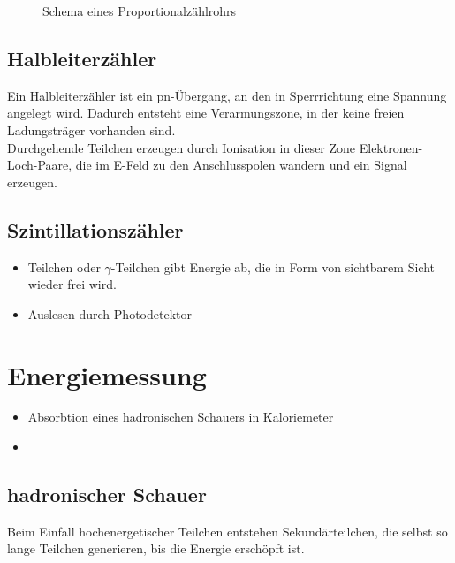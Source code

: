 \documentclass[Ex4_Zusammenfassung.tex]{subfiles}
\begin{document}
\begin{figure}[H]
	\centering
	\caption{Schema eines Proportionalzählrohrs}\label{Proportionalzaehlrohr}
	
\end{figure}

\subsection{Halbleiterzähler}
Ein Halbleiterzähler ist ein pn-Übergang, an den in Sperrrichtung eine Spannung angelegt wird. Dadurch entsteht eine Verarmungszone, in der keine freien Ladungsträger vorhanden sind.\\
Durchgehende Teilchen erzeugen durch Ionisation in dieser Zone Elektronen-Loch-Paare, die im E-Feld zu den Anschlusspolen wandern und ein Signal erzeugen. 

\subsection{Szintillationszähler}
\begin{itemize}
	\item Teilchen oder $\gamma$-Teilchen gibt Energie ab, die in Form von sichtbarem Sicht wieder frei wird.
	\item Auslesen durch Photodetektor
\end{itemize}

\section{Energiemessung}

\begin{itemize}
	\item Absorbtion eines hadronischen Schauers in Kaloriemeter
	\item {}
\end{itemize}

\subsection{hadronischer Schauer}
Beim Einfall hochenergetischer Teilchen entstehen Sekundärteilchen, die selbst so lange Teilchen generieren, bis die Energie erschöpft ist. \\
\end{document}
